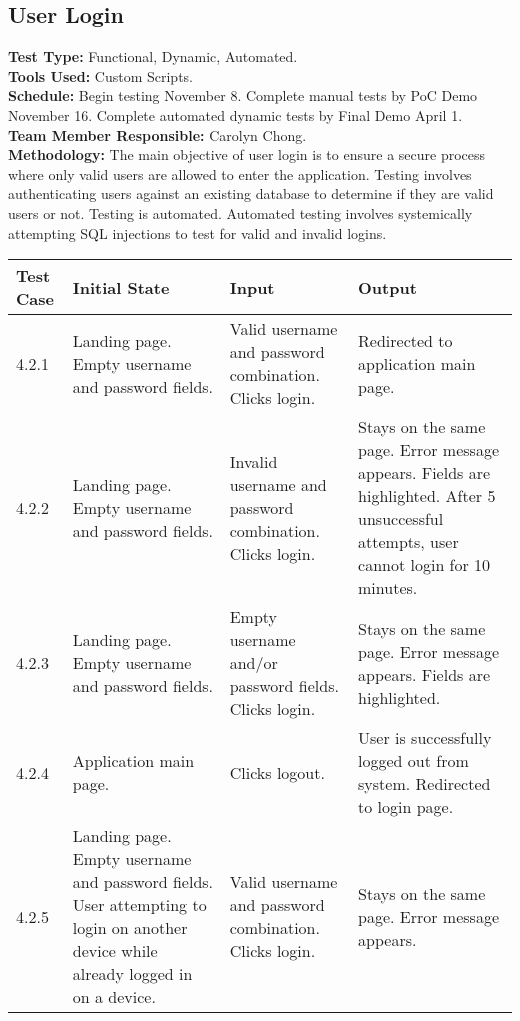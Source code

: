 \documentclass[12pt]{article}
\begin{document}
\subsection{User Login}
\textbf{Test Type:} Functional, Dynamic, Automated. \\
\textbf{Tools Used:} Custom Scripts. \\
\textbf{Schedule:} Begin testing November 8. Complete manual tests by PoC Demo November 16. Complete automated dynamic tests by Final Demo April 1. \\
\textbf{Team Member Responsible:} Carolyn Chong. \\
\textbf{Methodology:} The main objective of user login is to ensure a secure process where only valid users are allowed to enter the application. Testing involves authenticating users against an existing database to determine if they are valid users or not. Testing is automated. Automated testing involves systemically attempting SQL injections to test for valid and invalid logins.

\begin{longtable}{|p{2cm}|p{3cm}|p{5cm}|p{5cm}|}
\hline
\textbf{Test Case}  & \textbf{Initial State} & \textbf{Input} & \textbf{Output} \\ \hline
4.2.1 & Landing page. Empty username and password fields. & Valid username and password combination. Clicks login. & Redirected to application main page. \\ 
\hline
4.2.2 & Landing page. Empty username and password fields. & Invalid username and password combination. Clicks login. & Stays on the same page. Error message appears. Fields are highlighted. After 5 unsuccessful attempts, user cannot login for 10 minutes. \\
\hline
4.2.3 & Landing page. Empty username and password fields. & Empty username and/or password fields. Clicks login. & Stays on the same page. Error message appears. Fields are highlighted. \\
\hline
4.2.4 & Application main page. & Clicks logout. & User is successfully logged out from system. Redirected to login page. \\
\hline
4.2.5 & Landing page. Empty username and password fields. User attempting to login on another device while already logged in on a device. & Valid username and password combination. Clicks login. & Stays on the same page. Error message appears. \\ 
\hline
\end{longtable}
\end{document}
